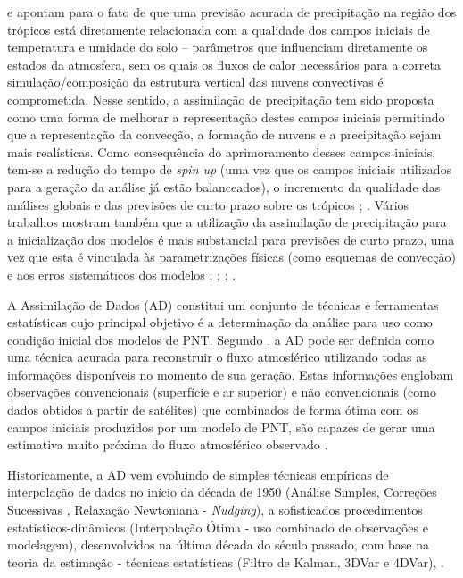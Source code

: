  e  apontam para o fato de que uma previsão acurada de precipitação na região dos trópicos está diretamente relacionada com a qualidade dos campos iniciais de temperatura e umidade do solo – parâmetros que influenciam diretamente os estados da atmosfera, sem os quais os fluxos de calor necessários para a correta simulação/composição da estrutura vertical das nuvens convectivas é comprometida. Nesse sentido, a assimilação de precipitação tem sido proposta como uma forma de melhorar a representação destes campos iniciais permitindo que a representação da convecção, a formação de nuvens e a precipitação sejam mais realísticas. Como consequência do aprimoramento desses campos iniciais, tem-se a redução do tempo de \textit{spin up} (uma vez que os campos iniciais utilizados para a geração da análise já estão balanceados), o incremento da qualidade das análises globais e das previsões de curto prazo sobre os trópicos \cite{heckleyetal90}; \cite{falkovichetal00}. Vários trabalhos mostram também que a utilização da assimilação de precipitação para a inicialização dos modelos é mais substancial para previsões de curto prazo, uma vez que esta é vinculada às parametrizações físicas (como esquemas de convecção) e aos erros sistemáticos dos modelos \cite{kasaharaetal94}; \cite{mathur95}; \cite{zupanskimesinger95}; \cite{nunescocke04}.

A Assimilação de Dados (AD) constitui um conjunto de técnicas e ferramentas estatísticas cujo principal objetivo é a determinação da análise para uso como condição inicial dos modelos de PNT. Segundo , a AD pode ser definida como uma técnica acurada para reconstruir o fluxo atmosférico utilizando todas as informações disponíveis no momento de sua geração. Estas informações englobam observações convencionais (superfície e ar superior) e não convencionais (como dados obtidos a partir de satélites) que combinados de forma ótima com os campos iniciais produzidos por um modelo de PNT, são capazes de gerar uma estimativa muito próxima do fluxo atmosférico observado \cite{kalnay03}.

Historicamente, a AD vem evoluindo de simples técnicas empíricas de interpolação de dados no início da década de 1950 (Análise Simples, Correções Sucessivas \cite{cressman59}, Relaxação Newtoniana - \textit{Nudging}), a sofisticados procedimentos estatísticos-dinâmicos (Interpolação Ótima - uso combinado de observações e modelagem), desenvolvidos na última década do século passado, com base na teoria da estimação - técnicas estatísticas (Filtro de Kalman, 3DVar e 4DVar), \cite{kalnay03}.

